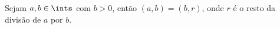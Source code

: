 \begin{exercise}
    Sejam $a, b \in \ints$ com $b > 0$, então $(a,b) = (b,r)$, onde $r$ é o
    resto da divisão de $a$ por $b$.
\end{exercise}

